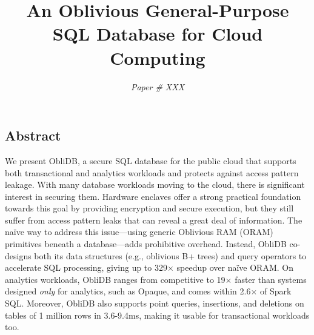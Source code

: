 \documentclass[letterpaper,twocolumn,10pt]{article}
\newcommand{\ignore}[1]{}
\def\name/{ObliDB}
\begin{document}
\date{\vspace{-0.9cm}}

\setlength{\droptitle}{-1.1cm}

\title{\Large \bf An Oblivious General-Purpose SQL Database for Cloud Computing\vspace{-0.1cm}}

\author{\emph{Paper \# XXX}}

\ignore{
\author{
{\rm Your N.\ Here}\\
Your Institution
\and
{\rm Second Name}\\
Second Institution
} %
}
\maketitle



\subsection*{Abstract}
We present \name/, a secure SQL database for the public cloud that supports both transactional and analytics workloads and protects against access pattern leakage.
With many database workloads moving to the cloud, there is significant interest in securing them.
Hardware enclaves offer a strong practical foundation towards this goal by providing encryption and secure execution, but they still suffer from access pattern leaks that can reveal a great deal of information.
The na\"ive way to address this issue---using generic Oblivious RAM (ORAM) primitives beneath a database---adds prohibitive overhead.
Instead, \name/ co-designs both its data structures (e.g., oblivious B+ trees) and query operators to accelerate SQL processing, giving up to 329$\times$ speedup over na\"ive ORAM.
On analytics workloads, \name/ ranges from competitive to 19$\times$ faster than systems designed \emph{only} for analytics, such as Opaque, and comes within 2.6$\times$ of Spark SQL.
Moreover, \name/ also supports point queries, insertions, and deletions on tables of 1 million rows in 3.6-9.4ms, making it usable for transactional workloads too.
\end{document}

